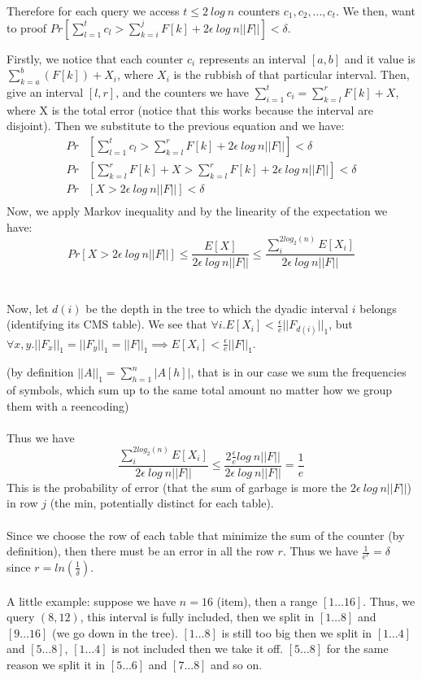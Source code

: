 \documentclass[a4paper]{article}
\begin{document}
Therefore for each query we access $t \leq 2\ log\ n$ counters $c_1,c_2,...,c_t$. We then, want to proof $Pr[\sum^t_{l=1}c_l > \sum^j_{k=i}F[k] + 2\epsilon\ log\ n ||F||]<\delta$.

Firstly, we notice that each counter $c_i$ represents an interval $[a,b]$ and it value is $\sum_{k=a}^b (F[k]) + X_i$, where $X_i$ is the rubbish of that particular interval. Then, give an interval $[l,r]$, and the counters we have $\sum^t_{i=1}c_i = \sum^r_{k=l}F[k] +X $, where X is the total error (notice that this works because the interval are disjoint). Then we substitute to the previous equation and we have:
\begin{align*}
Pr &[\sum^t_{l=1}c_l > \sum^r_{k=l}F[k] + 2\epsilon\ log\ n ||F||]<\delta \\
Pr &[ \sum^r_{k=l}F[k] +X  > \sum^r_{k=l}F[k] + 2\epsilon\ log\ n ||F||]<\delta \\
Pr &[ X  >  2\epsilon\ log\ n ||F||]<\delta \\
\end{align*}
Now, we apply Markov inequality and by the linearity of the expectation we have: $$Pr [ X  >  2\epsilon\ log\ n ||F||] \leq \frac{E[X]}{2\epsilon\ log\ n ||F||} \leq \frac{\sum_{i}^{2log_2(n)} E[X_i]}{2\epsilon\ log\ n ||F||}$$
\\
\\
Now, let $d(i)$ be the depth in the tree to which the dyadic interval $i$ belongs (identifying its CMS table). We see that $\forall i.E[X_i]< \frac{\epsilon}{e}||F_{d(i)}||_1$, but $\forall  x, y.||F_x||_1 = ||F_y||_1 = ||F||_1 \implies E[X_i]< \frac{\epsilon}{e}||F||_1$.

\noindent
(by definition $||A||_1 = \sum^n_{h=1}|A[h]|$, that is in our case we sum the frequencies of symbols, which sum up to the same total amount no matter how we group them with a reencoding)
\\
\\
Thus we have $$\frac{\sum_{i}^{2log_2(n)} E[X_i]}{2\epsilon\ log\ n ||F||} \leq \frac{2 \frac{\epsilon}{e}log \ n||F||}{2\epsilon\ log\ n ||F||}= \frac{1}{e}$$
This is the probability of error (that the sum of garbage is more the $2\epsilon\ log\ n ||F||$) in row $j$ (the min, potentially distinct for each table).
\\
\\
Since we choose the row of each table that minimize the sum of the counter (by definition), then there must be an error in all the row $r$. Thus we have $\frac{1}{e^r}=\delta$ since $r=ln(\frac{1}{\delta})$.\\ \\

A little example: suppose we have $n=16$ (item), then a range $[1 \dots 16]$. Thus, we query $(8,12)$, this interval is fully included, then we split in $[1 \dots 8]$ and $[9 \dots 16]$ (we go down in the tree). $[1 \dots 8]$ is still too big then we split in $[1 \dots 4]$ and $[5 \dots 8]$,  $[1 \dots 4]$ is not included then we take it off. $[5 \dots 8]$ for the same reason we split it in $[5 \dots 6]$ and $[7 \dots 8]$ and so on.\\
\end{document}
